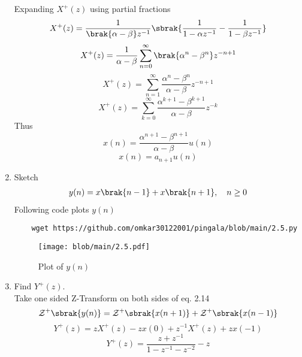 \documentclass[journal,12pt,twocolumn]{IEEEtran}
\renewcommand\thesection{\arabic{section}}
\begin{document}
\begin{enumerate}[label=\thesection.\arabic*,ref=\thesection.\theenumi]
\solution
Expanding $X^{+}(z)$ using partial fractions
\begin{equation}
	X^{+}(z) = \frac{1}{\brak{\alpha - \beta}z^{-1}}\sbrak{\frac{1}{1 - \alpha{z^{-1}}} - \frac{1}{1 - \beta{z^{-1}}}}
\end{equation}
\begin{equation}
	X^{+}(z) = \frac{1}{\alpha - \beta}\sum_{n=0}^{\infty}\brak{{\alpha}^{n} - {\beta}^{n}}z^{-n+1}
\end{equation}
\begin{equation}
	X^{+}(z) = \sum_{n=1}^{\infty}\frac{{\alpha}^{n} - {\beta}^{n}}{\alpha - \beta}z^{-n+1}
\end{equation}
\begin{equation}
	X^{+}(z) = \sum_{k=0}^{\infty}\frac{{\alpha}^{k+1} - {\beta}^{k+1}}{\alpha - \beta}z^{-k}
\end{equation}
Thus
\begin{equation}
	x(n) = \frac{{\alpha}^{n+1} - {\beta}^{n+1}}{\alpha - \beta}u(n)
\end{equation}
\begin{equation}
	\boxed{x(n) = a_{n+1}u(n)}
\end{equation}
\item Sketch 
\begin{align}
	y(n)	 = x\brak{n-1} + x\brak{n+1},  \quad n \ge 0
	\label{eq:10-orig-diff-rev}
\end{align}
\solution
Following code plots $y(n)$
\begin{lstlisting}
	wget https://github.com/omkar30122001/pingala/blob/main/2.5.py
\end{lstlisting}
\begin{figure}[!htp]
	\texttt{[image: blob/main/2.5.pdf]}
	\caption{Plot of $y(n)$}
	\label{fig:yn}
\end{figure}
\item Find $Y^{+}(z)$. \\
\solution
Take one sided Z-Transform on both sides of eq. 2.14
\begin{equation}
	\mathcal{Z}^{+}\sbrak{y(n)} = \mathcal{Z}^{+}\sbrak{x(n + 1)} + \mathcal{Z}^{+}\sbrak{x(n - 1)}
\end{equation}
\begin{equation}
	Y^{+}(z) = zX^{+}(z) - zx(0) + z^{-1}X^{+}(z) + zx(-1)
\end{equation}
\begin{equation}
	Y^{+}(z) = \frac{z + z^{-1}}{1 - z^{-1} - z^{-2}} - z
\end{equation}

\end{enumerate}
\end{document}
